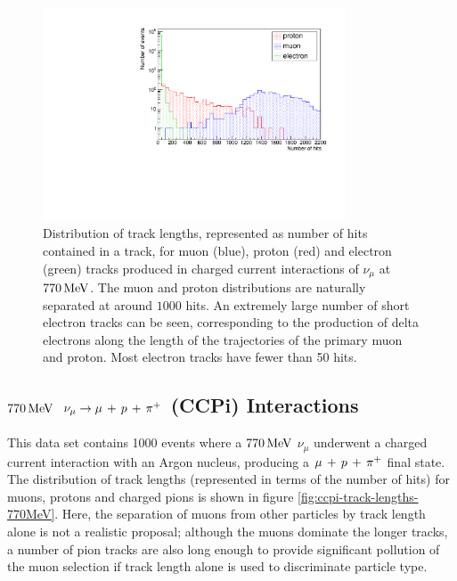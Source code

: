 \begin{figure}
\centering
\includegraphics[angle=-90,width=0.8\textwidth]{chapters/particleid_images/particle-lengths-ccqe-770}
\caption[Track length distribution for $\mu$, $p$ and $e^-$ from $770\MeV$ neutrinos (CCQE)]{\label{fig:ccqe-track-lengths-770MeV}Distribution of track lengths, represented as number of hits contained in a track, for muon (blue), proton (red) and electron (green) tracks produced in charged current interactions of $\nu_\mu$ at $770\MeV$. The muon and proton distributions are naturally separated at around $1000$ hits. An extremely large number of short electron tracks can be seen, corresponding to the production of delta electrons along the length of the trajectories of the primary muon and proton. Most electron tracks have fewer than 50 hits.}
\end{figure}

\subsection{$770\MeV$ $\nu_\mu \rightarrow \mu\,+\,p\,+\,\pi^{+}$ (\acs{CCPi}) Interactions}
This data set contains 1000 events where a $770\MeV$ $\nu_\mu$ underwent a charged current interaction with an Argon nucleus, producing a $\mu\,+\,p\,+\,\pi^{+}$ final state. The distribution of track lengths (represented in terms of the number of hits) for muons, protons and charged pions is shown in figure \ref{fig:ccpi-track-lengths-770MeV}. Here, the separation of muons from other particles by track length alone is not a realistic proposal; although the muons dominate the longer tracks, a number of pion tracks are also long enough to provide significant pollution of the muon selection if track length alone is used to discriminate particle type.


